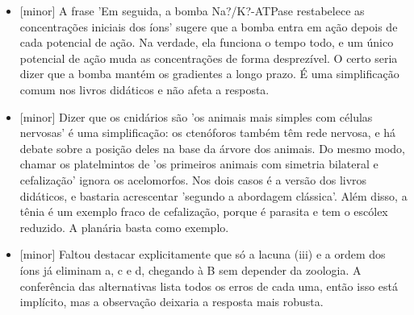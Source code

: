\documentclass{article}%
\begin{document}
\begin{itemize}%
\item%
{[}minor{]} A frase 'Em seguida, a bomba Na?/K?{-}ATPase restabelece as concentrações iniciais dos íons' sugere que a bomba entra em ação depois de cada potencial de ação. Na verdade, ela funciona o tempo todo, e um único potencial de ação muda as concentrações de forma desprezível. O certo seria dizer que a bomba mantém os gradientes a longo prazo. É uma simplificação comum nos livros didáticos e não afeta a resposta.%
\item%
{[}minor{]} Dizer que os cnidários são 'os animais mais simples com células nervosas' é uma simplificação: os ctenóforos também têm rede nervosa, e há debate sobre a posição deles na base da árvore dos animais. Do mesmo modo, chamar os platelmintos de 'os primeiros animais com simetria bilateral e cefalização' ignora os acelomorfos. Nos dois casos é a versão dos livros didáticos, e bastaria acrescentar 'segundo a abordagem clássica'. Além disso, a tênia é um exemplo fraco de cefalização, porque é parasita e tem o escólex reduzido. A planária basta como exemplo.%
\item%
{[}minor{]} Faltou destacar explicitamente que só a lacuna (iii) e a ordem dos íons já eliminam a, c e d, chegando à B sem depender da zoologia. A conferência das alternativas lista todos os erros de cada uma, então isso está implícito, mas a observação deixaria a resposta mais robusta.%
\end{itemize}%
\end{document}
